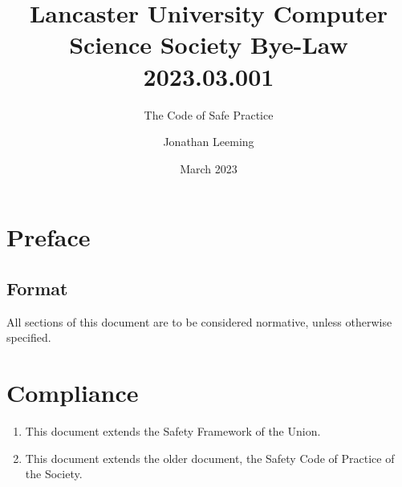 \documentclass{scrartcl}
\title{Lancaster University Computer Science Society Bye-Law 2023.03.001}
\subtitle{The Code of Safe Practice}
\author{Jonathan Leeming}
\date{March 2023}
\begin{document}
    \maketitle
    
    \clearpage
    \tableofcontents

    \clearpage
    \section{Preface}
        \label{preface}
        \subsection{Format}
            \label{preface--format}
            All sections of this document are to be considered normative, unless otherwise specified.

    \clearpage
    \section{Compliance}
        \label{compliance}
        \begin{enumerate}
            \item This document extends the Safety Framework of the Union.
            \item This document extends the older document, the Safety Code of Practice of the Society.
        \end{enumerate}
\end{document}
